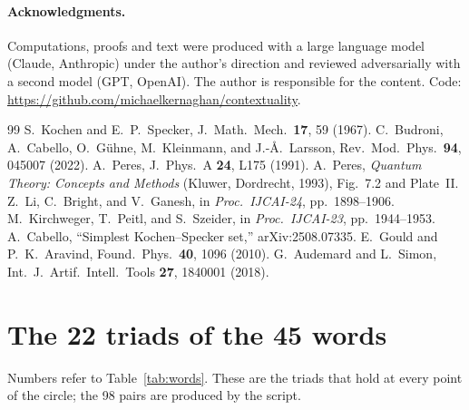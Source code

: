\documentclass[11pt,a4paper]{article}
\theoremstyle{remark}
\begin{document}
\paragraph{Acknowledgments.}  Computations, proofs and text were produced with a large language
model (Claude, Anthropic) under the author's direction and reviewed adversarially with a second
model (GPT, OpenAI).  The author is responsible for the content.  Code:
\url{https://github.com/michaelkernaghan/contextuality}.

\begin{thebibliography}{99}
 S.~Kochen and E.~P.~Specker, J.\ Math.\ Mech.\ \textbf{17}, 59 (1967).
 C.~Budroni, A.~Cabello, O.~G\"uhne, M.~Kleinmann, and J.-{\AA}.~Larsson,
Rev.\ Mod.\ Phys.\ \textbf{94}, 045007 (2022).
 A.~Peres, J.\ Phys.\ A \textbf{24}, L175 (1991).
 A.~Peres, \textit{Quantum Theory: Concepts and Methods} (Kluwer, Dordrecht,
1993), Fig.~7.2 and Plate~II.
 Z.~Li, C.~Bright, and V.~Ganesh, in \textit{Proc.\ IJCAI-24},
pp.~1898--1906.
 M.~Kirchweger, T.~Peitl, and S.~Szeider, in
\textit{Proc.\ IJCAI-23}, pp.~1944--1953.
 A.~Cabello, ``Simplest Kochen--Specker set,'' arXiv:2508.07335.
 E.~Gould and P.~K.~Aravind, Found.\ Phys.\ \textbf{40}, 1096 (2010).
 G.~Audemard and L.~Simon, Int.\ J.\ Artif.\ Intell.\ Tools
\textbf{27}, 1840001 (2018).
\end{thebibliography}

\appendix
\section{The 22 triads of the 45 words}
Numbers refer to Table~\ref{tab:words}.  These are the triads that hold at every point of the
circle; the 98 pairs are produced by the script.

\smallskip\noindent\raggedright

\end{document}
